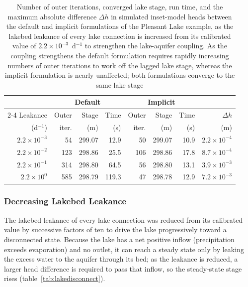 \begin{table}[!ht]
	\caption[Comparison of the default and implicit lake formulations as lakebed leakance is increased]{Number of outer iterations, converged lake stage, run time, and the maximum absolute difference $\Delta h$ in simulated inset-model heads between the default and implicit formulations of the Pleasant Lake example, as the lakebed leakance of every lake connection is increased from its calibrated value of $2.2 \times 10^{-3}$~d$^{-1}$ to strengthen the lake-aquifer coupling. As the coupling strengthens the default formulation requires rapidly increasing numbers of outer iterations to work off the lagged lake stage, whereas the implicit formulation is nearly unaffected; both formulations converge to the same lake stage}
	\label{tab:lakestrong}
	\small
	\centering
	\begin{tabular}{r rrr rrr r}
		\hline
		\hline
		& \multicolumn{3}{c}{Default} & \multicolumn{3}{c}{Implicit} & \\
		\cline{2-4} \cline{5-7}
		Leakance & Outer & Stage & Time & Outer & Stage & Time & $\Delta h$ \\
		(d$^{-1}$) & iter. & (m) & (s) & iter. & (m) & (s) & (m) \\
		\hline
		$2.2 \times 10^{-3}$ & 54 & 299.07 & 12.9 & 50 & 299.07 & 10.9 & $2.2 \times 10^{-4}$ \\
		$2.2 \times 10^{-2}$ & 123 & 298.86 & 25.5 & 106 & 298.86 & 17.8 & $8.7 \times 10^{-4}$ \\
		$2.2 \times 10^{-1}$ & 314 & 298.80 & 64.5 & 56 & 298.80 & 13.1 & $3.9 \times 10^{-3}$ \\
		$2.2 \times 10^{0}$ & 585 & 298.79 & 119.3 & 47 & 298.78 & 12.9 & $7.2 \times 10^{-3}$ \\
		\hline
		\hline
	\end{tabular}
\end{table}

\subsubsection{Decreasing Lakebed Leakance}

The lakebed leakance of every lake connection was reduced from its calibrated value by successive factors of ten to drive the lake progressively toward a disconnected state. Because the lake has a net positive inflow (precipitation exceeds evaporation) and no outlet, it can reach a steady state only by leaking the excess water to the aquifer through its bed; as the leakance is reduced, a larger head difference is required to pass that inflow, so the steady-state stage rises (table~\ref{tab:lakedisconnect}).

